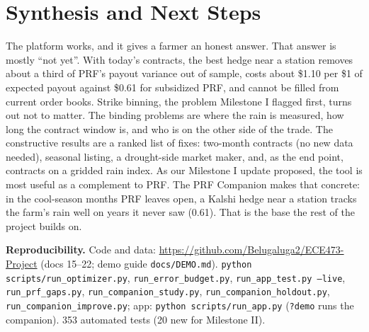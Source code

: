 \documentclass[11pt]{article}
\begin{document}
\section{Synthesis and Next Steps}

The platform works, and it gives a farmer an honest answer. That answer is mostly ``not yet''. With
today's contracts, the best hedge near a station removes about a third of PRF's payout variance out of
sample, costs about \$1.10 per \$1 of expected payout against \$0.61 for subsidized PRF, and cannot be
filled from current order books. Strike binning, the problem Milestone I flagged first, turns out not to
matter. The binding problems are where the rain is measured, how long the contract window is, and who is
on the other side of the trade. The constructive results are a ranked list of fixes: two-month contracts
(no new data needed), seasonal listing, a drought-side market maker, and, as the end point, contracts on a
gridded rain index. As our Milestone I update proposed, the tool is most useful as a complement to PRF.
The PRF Companion makes that concrete: in the cool-season months PRF leaves open, a Kalshi hedge near a
station tracks the farm's rain well on years it never saw (0.61). That is the base the rest of the project
builds on.

\textbf{Reproducibility.} Code and data: \url{https://github.com/Belugaluga2/ECE473-Project} (docs 15--22; demo guide \texttt{docs/DEMO.md}).
\texttt{python scripts/run\_optimizer.py}, \texttt{run\_error\_budget.py}, \texttt{run\_app\_test.py
--live}, \texttt{run\_prf\_gaps.py}, \texttt{run\_companion\_study.py}, \texttt{run\_companion\_holdout.py}, \texttt{run\_companion\_improve.py};
app: \texttt{python scripts/run\_app.py} (\texttt{?demo} runs the companion). 353 automated tests (20 new for Milestone II).
\end{document}
